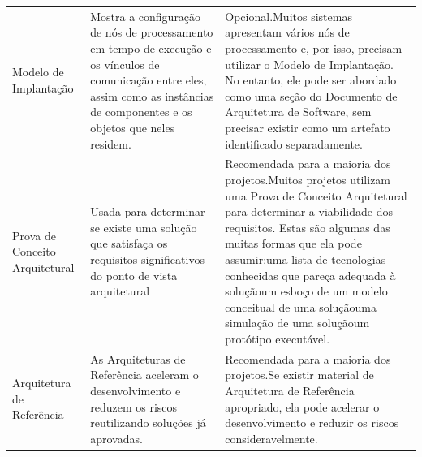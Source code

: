 \begin{table}[]
\begin{tabular}{lll}
Modelo de Implantação                              & Mostra a configuração de nós de processamento em tempo de execução e os vínculos de comunicação entre eles, assim como as instâncias de componentes e os objetos que neles residem.                                                                                                                                                                                                                               & Opcional.Muitos sistemas apresentam vários nós de processamento e, por isso, precisam utilizar o Modelo de Implantação. No entanto, ele pode ser abordado como uma seção do Documento de Arquitetura de Software, sem precisar existir como um artefato identificado separadamente.                                                                                              \\
Prova de Conceito Arquitetural                     & Usada para determinar se existe uma solução que satisfaça os requisitos significativos do ponto de vista arquitetural                                                                                                                                                                                                                                                                                             & Recomendada para a maioria dos projetos.Muitos projetos utilizam uma Prova de Conceito Arquitetural para determinar a viabilidade dos requisitos. Estas são algumas das muitas formas que ela pode assumir:uma lista de tecnologias conhecidas que pareça adequada à soluçãoum esboço de um modelo conceitual de uma soluçãouma simulação de uma soluçãoum protótipo executável. \\
Arquitetura de Referência                          & As Arquiteturas de Referência aceleram o desenvolvimento e reduzem os riscos reutilizando soluções já aprovadas.                                                                                                                                                                                                                                                                                                  & Recomendada para a maioria dos projetos.Se existir material de Arquitetura de Referência apropriado, ela pode acelerar o desenvolvimento e reduzir os riscos consideravelmente.                                                                                                                                                                                                  \\

\end{tabular}
\end{table}
